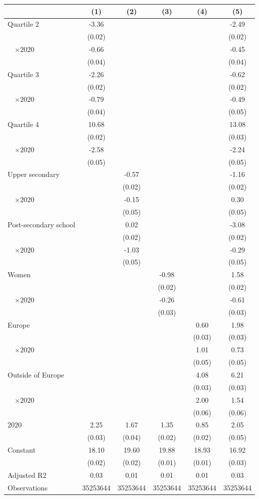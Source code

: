 
\begin{tabular}{@{}l*{5}{S[table-format={-}2.2{\tnote{***}}]}@{}}
\toprule
{} & {(1)} & {(2)} & {(3)} & {(4)} & {(5)}\tabularnewline%
\midrule
Quartile 2 & -3.36\tnote{***} &  &  &  & -2.49\tnote{***}\tabularnewline%
 & (0.02) &  &  &  & \vphantom{1} (0.02)\tabularnewline%
~~\(\times 2020\) & -0.66\tnote{***} &  &  &  & -0.45\tnote{***}\tabularnewline%
 & (0.04) &  &  &  & (0.04)\tabularnewline%
Quartile 3 & -2.26\tnote{***} &  &  &  & -0.62\tnote{***}\tabularnewline%
 & (0.02) &  &  &  & (0.02)\tabularnewline%
~~\(\times 2020\) & -0.79\tnote{***} &  &  &  & -0.49\tnote{***}\tabularnewline%
 & (0.04) &  &  &  & (0.05)\tabularnewline%
Quartile 4 & 10.68\tnote{***} &  &  &  & 13.08\tnote{***}\tabularnewline%
 & (0.02) &  &  &  & (0.03)\tabularnewline%
~~\(\times 2020\) & -2.58\tnote{***} &  &  &  & -2.24\tnote{***}\tabularnewline%
 & (0.05) &  &  &  & (0.05)\tabularnewline%
Upper secondary &  & -0.57\tnote{***} &  &  & -1.16\tnote{***}\tabularnewline%
 &  & (0.02) &  &  & \vphantom{1} (0.02)\tabularnewline%
~~\(\times 2020\) &  & -0.15\tnote{**} &  &  & 0.30\tnote{***}\tabularnewline%
 &  & (0.05) &  &  & \vphantom{1} (0.05)\tabularnewline%
Post-secondary school &  & 0.02 &  &  & -3.08\tnote{***}\tabularnewline%
 &  & (0.02) &  &  & (0.02)\tabularnewline%
~~\(\times 2020\) &  & -1.03\tnote{***} &  &  & -0.29\tnote{***}\tabularnewline%
 &  & (0.05) &  &  & (0.05)\tabularnewline%
Women &  &  & -0.98\tnote{***} &  & 1.58\tnote{***}\tabularnewline%
 &  &  & (0.02) &  & (0.02)\tabularnewline%
~~\(\times 2020\) &  &  & -0.26\tnote{***} &  & -0.61\tnote{***}\tabularnewline%
 &  &  & (0.03) &  & (0.03)\tabularnewline%
Europe &  &  &  & 0.60\tnote{***} & 1.98\tnote{***}\tabularnewline%
 &  &  &  & (0.03) & \vphantom{1} (0.03)\tabularnewline%
~~\(\times 2020\) &  &  &  & 1.01\tnote{***} & 0.73\tnote{***}\tabularnewline%
 &  &  &  & (0.05) & (0.05)\tabularnewline%
Outside of Europe &  &  &  & 4.08\tnote{***} & 6.21\tnote{***}\tabularnewline%
 &  &  &  & (0.03) & (0.03)\tabularnewline%
~~\(\times 2020\) &  &  &  & 2.00\tnote{***} & 1.54\tnote{***}\tabularnewline%
 &  &  &  & (0.06) & (0.06)\tabularnewline%
\midrule
\(2020\) & 2.25\tnote{***} & 1.67\tnote{***} & 1.35\tnote{***} & 0.85\tnote{***} & 2.05\tnote{***}\tabularnewline%
 & (0.03) & (0.04) & (0.02) & (0.02) & (0.05)\tabularnewline%
Constant & 18.10\tnote{***} & 19.60\tnote{***} & 19.88\tnote{***} & 18.93\tnote{***} & 16.92\tnote{***}\tabularnewline%
 & (0.02) & (0.02) & (0.01) & (0.01) & (0.03)\tabularnewline%
\midrule
Adjusted R2 & 0.03 & 0.01 & 0.01 & 0.01 & 0.03\tabularnewline%
Observations & {\num{35253644}} & {\num{35253644}} & {\num{35253644}} & {\num{35253644}} & {\num{35253644}}\tabularnewline%
\bottomrule
\end{tabular}
